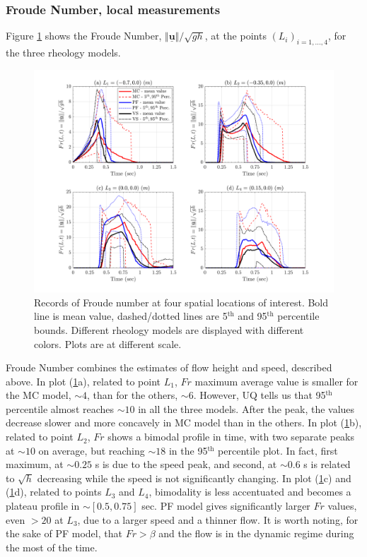 \documentclass{article}
\begin{document}
\subsubsection{Froude Number, local measurements}
Figure \ref{fig:Ramp-Fr} shows the Froude Number, $\Vert \underline{\mathbf{u}} \Vert/\sqrt{gh}$, at the points $(L_i)_{i=1,\dots,4}$, for the three rheology models.
\begin{figure}[H]
         \centering
        \includegraphics[width=1\textwidth]{InclinedPlane/LocalMeasurments/Froude.png}
        \caption{Records of Froude number at four spatial locations of interest. Bold line is mean value, dashed/dotted lines are 5$^{\mathrm{th}}$ and 95$^{\mathrm{th}}$ percentile bounds. Different rheology models are displayed with different colors. Plots are at different scale.}
        \label{fig:Ramp-Fr}
\end{figure}
Froude Number combines the estimates of flow height and speed, described above. In plot (\ref{fig:Ramp-Fr}a), related to point $L_1$, $Fr$ maximum average value is smaller for the MC model, $\sim 4$, than for the others, $\sim 6$. However, UQ tells us that 95$^{\mathrm{th}}$ percentile almost reaches $\sim 10$ in all the three models. After the peak, the values decrease slower and more concavely in MC model than in the others. In plot (\ref{fig:Ramp-Fr}b), related to point $L_2$, $Fr$ shows a bimodal profile in time, with two separate peaks at $\sim 10$ on average, but reaching $\sim 18$ in the 95$^{\mathrm{th}}$ percentile plot. In fact, first maximum, at $\sim 0.25$ s is due to the speed peak, and second, at $\sim 0.6$ s is related to $\sqrt{h}$ decreasing while the speed is not significantly changing. In plot (\ref{fig:Ramp-Fr}c) and (\ref{fig:Ramp-Fr}d), related to points $L_3$ and $L_4$, bimodality is less accentuated and becomes a plateau profile in $\sim [0.5, 0.75]$ sec. PF model gives significantly larger $Fr$ values, even $>20$ at $L_3$, due to a larger speed and a thinner flow. It is worth noting, for the sake of PF model, that $Fr>\beta$ and the flow is in the dynamic regime during the most of the time.
\end{document}
